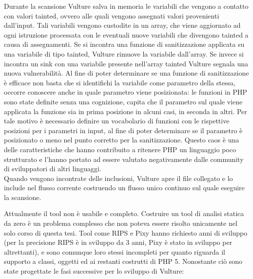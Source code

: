 Durante la scansione Vulture salva in memoria le variabili che vengono a contatto con valori tainted, ovvero alle quali vengono assegnati valori provenienti dall'input. Tali variabili vengono custodite in un array, che viene aggiornato ad ogni istruzione processata con le eventuali nuove variabili che divengono tainted a causa di assegnamenti. Se si incontra una funzione di sanitizzazione applicata su una variabile di tipo tainted, Vulture rimuove la variabile dall'array. Se invece si incontra un sink con una variabile presente nell'array tainted Vulture segnala una nuova vulnerabilità. Al fine di poter determinare se una funzione di sanitizzazione è efficace non basta che si identifichi la variabile come parametro della stessa, occorre conoscere anche in quale parametro viene posizionata: le funzioni in PHP sono state definite senza una cognizione, capita che il parametro sul quale viene applicata la funzione sia in prima posizione in alcuni casi, in seconda in altri. Per tale motivo è necessario definire un vocabolario di funzioni con le rispettive posizioni per i parametri in input, al fine di poter determinare se il parametro è posizionato o meno nel punto corretto per la sanitizzazione. Questo caos è una delle caratteristiche che hanno contribuito a ritenere PHP un linguaggio poco strutturato e l'hanno portato ad essere valutato negativamente dalle community di sviluppatori di altri linguaggi\cite{codinghorror}.\\
Quando vengono incontrate delle inclusioni, Vulture apre il file collegato e lo include nel flusso corrente costruendo un flusso unico continuo sul quale eseguire la scansione.

Attualmente il tool non è usabile e completo. Costruire un tool di analisi statica da zero è un problema complesso che non poteva essere risolto unicamente nel solo corso di questa tesi. Tool come RIPS e Pixy hanno richiesto anni di sviluppo (per la precisione RIPS è in sviluppo da 3 anni, Pixy è stato in sviluppo per altrettanti), e sono comunque loro stessi incompleti per quanto riguarda il supporto a classi, oggetti ed ai restanti costrutti di PHP 5.
Nonostante ciò sono state progettate le fasi successive per lo sviluppo di Vulture:

